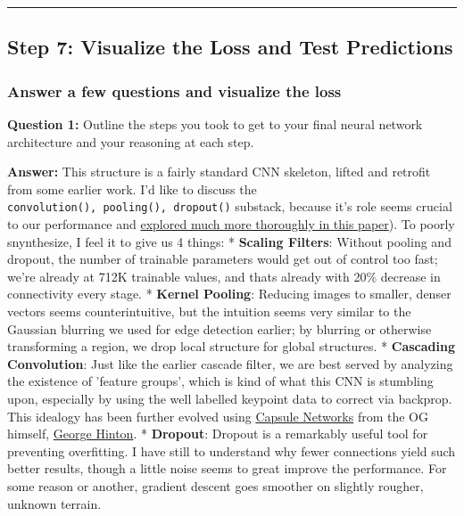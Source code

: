 \documentclass[11pt]{article}
\begin{document}
    \begin{center}\rule{0.5\linewidth}{\linethickness}\end{center}

\subsection{Step 7: Visualize the Loss and Test
Predictions}\label{step-7-visualize-the-loss-and-test-predictions}

    \subsubsection{Answer a few questions and visualize the
loss}\label{answer-a-few-questions-and-visualize-the-loss}

\textbf{Question 1:} Outline the steps you took to get to your final
neural network architecture and your reasoning at each step.

\textbf{Answer:} This structure is a fairly standard CNN skeleton,
lifted and retrofit from some earlier work. I'd like to discuss the
\texttt{convolution(),\ pooling(),\ dropout()} substack, because it's
role seems crucial to our performance and
\href{http://arxiv.org/pdf/1312.4400.pdf}{explored much more thoroughly
in this paper}). To poorly snynthesize, I feel it to give us 4 things: *
\textbf{Scaling Filters}: Without pooling and dropout, the number of
trainable parameters would get out of control too fast; we're already at
712K trainable values, and thats already with 20\% decrease in
connectivity every stage. * \textbf{Kernel Pooling}: Reducing images to
smaller, denser vectors seems counterintuitive, but the intuition seems
very similar to the Gaussian blurring we used for edge detection
earlier; by blurring or otherwise transforming a region, we drop local
structure for global structures. * \textbf{Cascading Convolution}: Just
like the earlier cascade filter, we are best served by analyzing the
existence of 'feature groups', which is kind of what this CNN is
stumbling upon, especially by using the well labelled keypoint data to
correct via backprop. This idealogy has been further evolved using
\href{https://medium.com/ai\%C2\%B3-theory-practice-business/understanding-hintons-capsule-networks-part-ii-how-capsules-work-153b6ade9f66}{Capsule
Networks} from the OG himself,
\href{http://www.cs.toronto.edu/~hinton/}{George Hinton}. *
\textbf{Dropout}: Dropout is a remarkably useful tool for preventing
overfitting. I have still to understand why fewer connections yield such
better results, though a little noise seems to great improve the
performance. For some reason or another, gradient descent goes smoother
on slightly rougher, unknown terrain.
\end{document}
